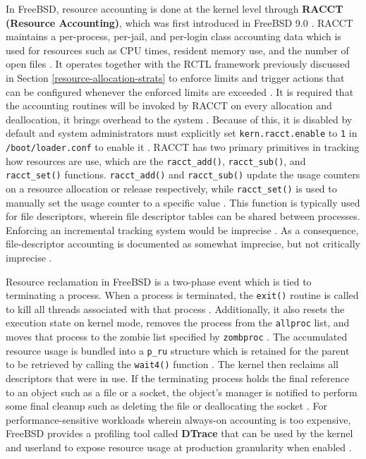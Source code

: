 In FreeBSD, resource accounting is done at the kernel level through \textbf{RACCT (Resource Accounting)}, which was first introduced
in FreeBSD 9.0 \parencite{freebsd_9_relnotes}. RACCT maintains a per-process, per-jail, and per-login class accounting data which is
used for resources such as CPU times, resident memory use, and the number of open files \parencite{freebsd_racct_status}. It operates
together with the RCTL framework previously discussed in Section \ref{resource-allocation-strats} to enforce limits and trigger actions
that can be configured whenever the enforced limits are exceeded \parencite{freebsd_racct_status}. It is required that the accounting
routines will be invoked by RACCT on every allocation and deallocation, it brings overhead to the system \parencite{freebsd_racct_status}.
Because of this, it is disabled by default and system administrators must explicitly set \texttt{kern.racct.enable} to \texttt{1} in
\texttt{/boot/loader.conf} to enable it \parencites{freebsd_racct_status}{freebsd_resource_limits}.
RACCT has two primary primitives in tracking how resources are use, which are the \texttt{racct\_add()}, \texttt{racct\_sub()},
and \texttt{racct\_set()} functions. \texttt{racct\_add()} and \texttt{racct\_sub()} update the usage counters on a resource allocation
or release respectively, while \texttt{racct\_set()} is used to manually set the usage counter to a specific value \parencite{freebsd_resource_limits}.
This function is typically used for file descriptors, wherein file descriptor tables can be shared between processes. Enforcing an incremental
tracking system would be imprecise \parencite{freebsd_resource_limits}. As a consequence, file-descriptor accounting is documented as
somewhat imprecise, but not critically imprecise \parencite{freebsd_resource_limits}.

Resource reclamation in FreeBSD is a two-phase event which is tied to terminating a process.
When a process is terminated, the \texttt{exit()} routine is called to kill all threads associated with that process \parencite{mckusick2014_process}.
Additionally, it also resets the execution state on kernel mode, removes the process from the \texttt{allproc} list, and moves that process
to the zombie list specified by \texttt{zombproc} \parencite{mckusick2014_process}. The accumulated resource usage is bundled into a
\texttt{p\_ru} structure which is retained for the parent to be retrieved by calling the \texttt{wait4()} function \parencite{mckusick2014_process}.
The kernel then reclaims all descriptors that were in use. If the terminating process holds the final reference to an object such as a file or a
socket, the object's manager is notified to perform some final cleanup such as deleting the file or deallocating the socket
\parencite{freebsd_design4bsd}. For performance-sensitive workloads wherein always-on accounting is too expensive, FreeBSD provides a profiling
tool called \textbf{DTrace} that can be used by the kernel and userland to expose resource usage at production granularity when enabled
\parencite{lavigne2021}.

